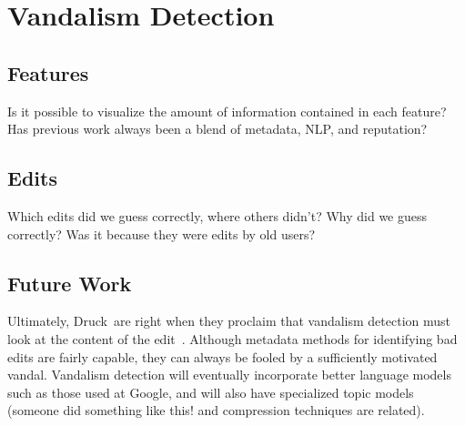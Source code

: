 
\chapter{Vandalism Detection}



    \section{Features}
        Is it possible to visualize the amount of information
        contained in each feature?
        Has previous work always been a blend of metadata, NLP,
        and reputation?
    \section{Edits}
        Which edits did we guess correctly, where others didn't?
        Why did we guess correctly?  Was it because they were edits
        by old users?

    \section{Future Work}
        Ultimately, Druck~\etal are right when they proclaim that
        vandalism detection must look at the content of the
        edit~\cite{Druck2008}.
        Although metadata methods for identifying bad edits are
        fairly capable, they can always be fooled by a sufficiently
        motivated vandal.
        Vandalism detection will eventually incorporate better
        language models such as those used at Google,
        and will also have specialized topic models (someone did
        something like this!  and compression techniques are
        related).


